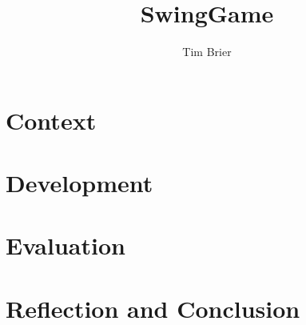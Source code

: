 \documentclass[]{report}
\title{SwingGame}
\author{Tim Brier}
\date{\parbox{\linewidth}{\centering%
		April 2015\endgraf\bigskip
		Steve Pettifer\endgraf\medskip
		Report for a third year project at the University of Manchester
}}
\begin{document}
\maketitle

\tableofcontents{}


\chapter{Context}
\chapter{Development}
\chapter{Evaluation}
\chapter{Reflection and Conclusion}
\end{document}
